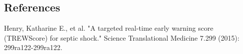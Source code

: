 \documentclass[twoside,11pt]{article}
\begin{document}
\subsection{References}
Henry, Katharine E., et al. "A targeted real-time early warning score (TREWScore) for septic shock." Science Translational Medicine 7.299 (2015): 299ra122-299ra122.


\end{document}
